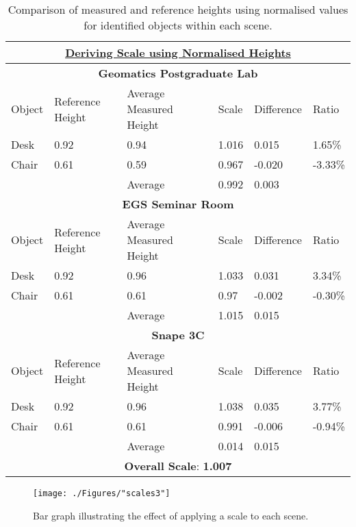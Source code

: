 \begin{table}[h!]
	\centering
	\begin{tabular}{|p{1.25cm}|p{2cm}|p{3.5cm}|p{1.85cm}|p{2cm}|p{1.25cm}|}
		\hline
		\multicolumn{6}{|c|}{\textbf{\underline{Deriving Scale using Normalised Heights}}} \\
		\hline
		\multicolumn{6}{|c|}{\textbf{Geomatics Postgraduate Lab}} \\
		\hline
		Object & Reference Height & Average Measured Height & Scale & Difference & Ratio \\
		\hline
		Desk & 0.92 & 0.94 & 1.016 & 0.015 & 1.65\% \\
		Chair & 0.61 & 0.59 & 0.967 & -0.020 & -3.33\% \\
		\hline
		& & Average & 0.992 & 0.003 &\\
		\hline
		\multicolumn{6}{|c|}{\textbf{EGS Seminar Room}} \\
		\hline
		Object & Reference Height & Average Measured Height & Scale & Difference & Ratio \\
		\hline
		Desk & 0.92 & 0.96 & 1.033 & 0.031 & 3.34\% \\
		Chair & 0.61 & 0.61 & 0.97 & -0.002 & -0.30\% \\
		\hline
		& & Average & 1.015 & 0.015 &\\
		\hline
		\multicolumn{6}{|c|}{\textbf{Snape 3C}} \\
		\hline
		Object & Reference Height & Average Measured Height & Scale & Difference & Ratio \\
		\hline
		Desk & 0.92 & 0.96 & 1.038 & 0.035 & 3.77\% \\
		Chair & 0.61 & 0.61 & 0.991 & -0.006 & -0.94\% \\
		\hline
		& & Average & 0.014 & 0.015 &\\
		\hline
		\multicolumn{6}{|c|}{\textbf{Overall Scale}: \textbf{1.007}}\\
		\hline
	\end{tabular}
	\caption[Comparing measured and reference heights using normalised values]{Comparison of measured and reference heights using normalised values for identified objects within each scene.}
	\label{scale3}
\end{table}
\begin{figure}[h!]
	\centering
	\texttt{[image: ./Figures/"scales3"]}
	\caption{Bar graph illustrating the effect of applying a scale to each scene. \label{scalegraph3}}
\end{figure}

